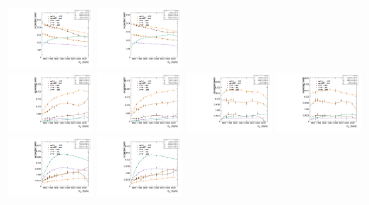 \begin{figure}[htbp]
  \includegraphics[width=0.2\textwidth]{fig/analysis/paramSignalYield_NonVBFSig_mu_LP_nobb_DEtaLo.pdf}
  \includegraphics[width=0.2\textwidth]{fig/analysis/paramSignalYield_NonVBFSig_e_LP_nobb_DEtaLo.pdf}\\
  \includegraphics[width=0.2\textwidth]{fig/analysis/paramSignalYield_NonVBFSig_mu_HP_vbf_DEtaLo.pdf}
  \includegraphics[width=0.2\textwidth]{fig/analysis/paramSignalYield_NonVBFSig_e_HP_vbf_DEtaLo.pdf}
  \includegraphics[width=0.2\textwidth]{fig/analysis/paramSignalYield_NonVBFSig_mu_LP_vbf_DEtaLo.pdf}
  \includegraphics[width=0.2\textwidth]{fig/analysis/paramSignalYield_NonVBFSig_e_LP_vbf_DEtaLo.pdf}\\
  \includegraphics[width=0.2\textwidth]{fig/analysis/paramSignalYield_NonVBFSig_mu_HP_bb_DEtaHi.pdf}
  \includegraphics[width=0.2\textwidth]{fig/analysis/paramSignalYield_NonVBFSig_e_HP_bb_DEtaHi.pdf}

\end{figure}
